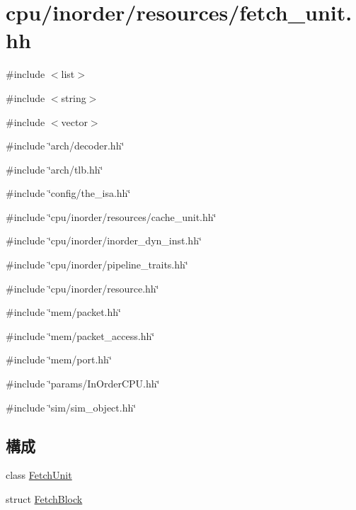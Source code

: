 \hypertarget{fetch__unit_8hh}{
\section{cpu/inorder/resources/fetch\_\-unit.hh}
\label{fetch__unit_8hh}
}
{\ttfamily \#include $<$list$>$}\par
{\ttfamily \#include $<$string$>$}\par
{\ttfamily \#include $<$vector$>$}\par
{\ttfamily \#include \char`\"{}arch/decoder.hh\char`\"{}}\par
{\ttfamily \#include \char`\"{}arch/tlb.hh\char`\"{}}\par
{\ttfamily \#include \char`\"{}config/the\_\-isa.hh\char`\"{}}\par
{\ttfamily \#include \char`\"{}cpu/inorder/resources/cache\_\-unit.hh\char`\"{}}\par
{\ttfamily \#include \char`\"{}cpu/inorder/inorder\_\-dyn\_\-inst.hh\char`\"{}}\par
{\ttfamily \#include \char`\"{}cpu/inorder/pipeline\_\-traits.hh\char`\"{}}\par
{\ttfamily \#include \char`\"{}cpu/inorder/resource.hh\char`\"{}}\par
{\ttfamily \#include \char`\"{}mem/packet.hh\char`\"{}}\par
{\ttfamily \#include \char`\"{}mem/packet\_\-access.hh\char`\"{}}\par
{\ttfamily \#include \char`\"{}mem/port.hh\char`\"{}}\par
{\ttfamily \#include \char`\"{}params/InOrderCPU.hh\char`\"{}}\par
{\ttfamily \#include \char`\"{}sim/sim\_\-object.hh\char`\"{}}\par
\subsection*{構成}
\begin{DoxyCompactItemize}
\item 
class \hyperlink{classFetchUnit}{FetchUnit}
\item 
struct \hyperlink{structFetchUnit_1_1FetchBlock}{FetchBlock}
\end{DoxyCompactItemize}
